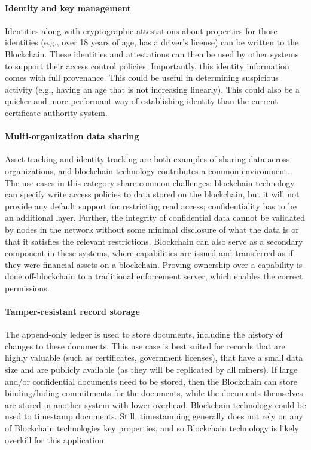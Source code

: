 \paragraph{Identity and key management}

Identities along with cryptographic attestations about properties for those identities (e.g., over 18 years of age, has a driver's license) can be written to the Blockchain.
These identities and attestations can then be used by other systems to support their access control policies.
Importantly, this identity information comes with full provenance. This could be useful in determining suspicious activity (e.g., having an age that is not increasing linearly).
This could also be a quicker and more performant way of establishing identity than the current certificate authority system.

\paragraph{Multi-organization data sharing}

Asset tracking and identity tracking are both examples of sharing data across organizations, and blockchain technology contributes a common environment.
The use cases in this category share common challenges: blockchain technology can specify write access policies to data stored on the blockchain, but it will not provide any default support for restricting read access; confidentiality has to be an additional layer.
Further, the integrity of confidential data cannot be validated by nodes in the network without some minimal disclosure of what the data is or that it satisfies the relevant restrictions.
Blockchain can also serve as a secondary component in these systems, where capabilities are issued and transferred as if they were financial assets on a blockchain. Proving ownership over a capability is done off-blockchain to a traditional enforcement server, which enables the correct permissions.


\paragraph{Tamper-resistant record storage}
The append-only ledger is used to store documents, including the history of changes to these documents.
This use case is best suited for records that are highly valuable (such as certificates, government licenses), that have a small data size and are publicly available (as they will be replicated by all miners).
If large and/or confidential documents need to be stored, then the Blockchain can store binding/hiding commitments for the documents, while the documents themselves are stored in another system with lower overhead.
Blockchain technology could be used to timestamp documents. Still, timestamping generally does not rely on any of Blockchain technologies key properties, and so Blockchain technology is likely overkill for this application.


